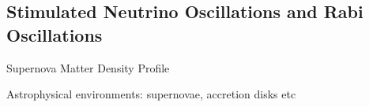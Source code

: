 \documentclass[9pt]{beamer}
\begin{document}
\begin{darkframes}
%
%
%
%
%
%
%
%
%
%
%
%


\subsection{Stimulated Neutrino Oscillations and Rabi Oscillations}

\begin{frame}{Supernova Matter Density Profile}

\begin{tcolorbox}%

Astrophysical environments: supernovae, accretion disks etc

\end{tcolorbox}


\end{frame}
\end{darkframes}
\end{document}
